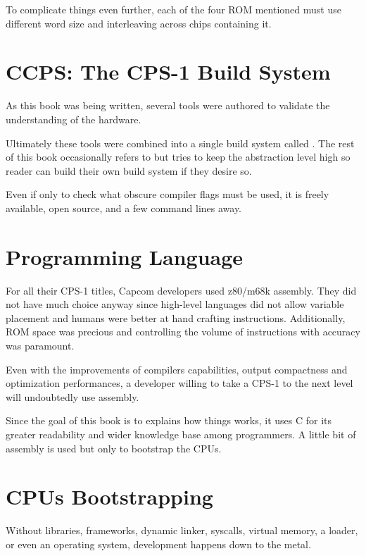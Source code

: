To complicate things even further, each of the four ROM mentioned must use different word size and interleaving across chips containing it.

\section{CCPS: The CPS-1 Build System}
As this book was being written, several tools were authored to validate the understanding of the hardware.

Ultimately these tools were combined into a single build system called . The rest of this book occasionally refers to  but tries to keep the abstraction level high so reader can build their own build system if they desire so. 

Even if only to check what obscure compiler flags must be used, it is freely available, open source, and a few command lines away.






\section{Programming Language}
For all their CPS-1 titles, Capcom developers used z80/m68k assembly. They did not have much choice anyway since high-level languages did not allow variable placement and humans were better at hand crafting instructions. Additionally, ROM space was precious and controlling the volume of instructions with accuracy was paramount.

Even with the improvements of compilers capabilities, output compactness and optimization performances, a developer willing to take a CPS-1 to the next level will undoubtedly use assembly.

Since the goal of this book is to explains how things works, it uses C for its greater readability and wider knowledge base among programmers. A little bit of assembly is used but only to bootstrap the CPUs.
	
\section{CPUs Bootstrapping}
Without libraries, frameworks, dynamic linker, syscalls, virtual memory, a loader, or even an operating system, development happens down to the metal. 

